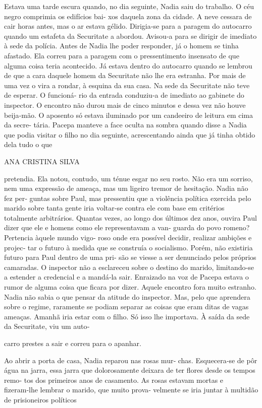 Estava uma tarde escura quando, no dia seguinte, Nadia saiu do trabalho.
O céu negro comprimia os edifícios bai‑ xos daquela zona da cidade. A
neve cessara de cair horas antes, mas o ar estava gélido. Dirigia‑se
para a paragem do autocarro quando um estafeta da Securitate a abordou.
Avisou‑a para se dirigir de imediato à sede da polícia. Antes de Nadia
lhe poder responder, já o homem se tinha afastado. Ela correu para a
paragem com o pressentimento insensato de que alguma coisa teria
acontecido. Já estava dentro do autocarro quando se lembrou de que a
cara daquele homem da Securitate não lhe era estranha. Por mais de uma
vez o vira a rondar, à esquina da sua casa. Na sede da Securitate não
teve de esperar. O funcioná‑ rio da entrada conduziu‑a de imediato ao
gabinete do inspector. O encontro não durou mais de cinco minutos e
dessa vez não houve beija‑mão. O aposento só estava iluminado por um
candeeiro de leitura em cima da secre‑ tária. Pacepa manteve a face
oculta na sombra quando disse a Nadia que podia visitar o filho no dia
seguinte, acrescentando ainda que já tinha obtido dela tudo o que

ANA CRISTINA SILVA

pretendia. Ela notou, contudo, um ténue esgar no seu rosto. Não era um
sorriso, nem uma expressão de ameaça, mas um ligeiro tremor de
hesitação. Nadia não fez per‑ guntas sobre Paul, mas pressentiu que a
violência política exercida pelo marido sobre tanta gente iria voltar‑se
contra ele com base em critérios totalmente arbitrários. Quantas vezes,
ao longo dos últimos dez anos, ouvira Paul dizer que ele e homens como
ele representavam a van‑ guarda do povo romeno? Pertencia àquele mundo
vigo‑ roso onde era possível decidir, realizar ambições e projec‑ tar o
futuro à medida que se construía o socialismo. Porém, não existiria
futuro para Paul dentro de uma pri‑ são se viesse a ser denunciado pelos
próprios camaradas. O inspector não a esclareceu sobre o destino do
marido, limitando‑se a estender a credencial e a mandá‑la sair.
Enraizado na voz de Pacepa estava o rumor de alguma coisa que ficara por
dizer. Aquele encontro fora muito estranho. Nadia não sabia o que pensar
da atitude do inspector. Mas, pelo que aprendera sobre o regime,
raramente se podiam separar as coisas que eram ditas de vagas ameaças.
Amanhã iria estar com o filho. Só isso lhe importava. À saída da sede da
Securitate, viu um auto‑

carro prestes a sair e correu para o apanhar.

Ao abrir a porta de casa, Nadia reparou nas rosas mur‑ chas.
Esquecera‑se de pôr água na jarra, essa jarra que dolorosamente deixara
de ter flores desde os tempos remo‑ tos dos primeiros anos de casamento.
As rosas estavam mortas e fizeram‑lhe lembrar o marido, que muito prova‑
velmente se iria juntar à multidão de prisioneiros políticos

